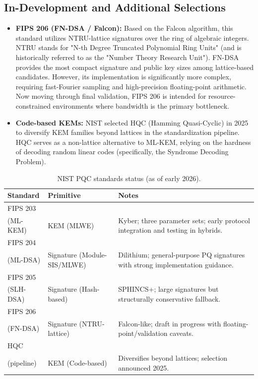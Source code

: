 \documentclass[11pt,a4paper]{article}
\begin{document}
\subsection{In-Development and Additional Selections}
\begin{itemize}[leftmargin=*]
  \item \textbf{FIPS 206 (FN-DSA / Falcon):} Based on the Falcon algorithm, this standard utilizes NTRU-lattice signatures over the ring of algebraic integers. NTRU stands for "N-th Degree Truncated Polynomial Ring Units" (and is historically referred to as the "Number Theory Research Unit"). FN-DSA provides the most compact signature and public key sizes among lattice-based candidates. However, its implementation is significantly more complex, requiring fast-Fourier sampling and high-precision floating-point arithmetic. Now moving through final validation, FIPS 206 is intended for resource-constrained environments where bandwidth is the primary bottleneck.\cite{fips206status}
  \item \textbf{Code-based KEMs:} NIST selected HQC (Hamming Quasi-Cyclic) in 2025 to diversify KEM families beyond lattices in the standardization pipeline. HQC serves as a non-lattice alternative to ML-KEM, relying on the hardness of decoding random linear codes (specifically, the Syndrome Decoding Problem).\cite{nistpqc}
\end{itemize}

\begin{table}[ht]
\centering
\begin{tabular}{@{}p{2.5cm}p{3.8cm}p{8.5cm}@{}}
\toprule
\textbf{Standard} & \textbf{Primitive} & \textbf{Notes} \\
\midrule
FIPS 203 \\(ML-KEM) & KEM (MLWE) & Kyber; three parameter sets; early protocol integration and testing in hybrids.\\
FIPS 204 \\(ML-DSA) & Signature \hspace{8mm}(Module-SIS/MLWE) & Dilithium; general-purpose PQ signatures with strong implementation guidance.\\
FIPS 205 \\(SLH-DSA) & Signature \hspace{12mm}(Hash-based) & SPHINCS+; large signatures but structurally conservative fallback.\\
FIPS 206 \\(FN-DSA) & Signature \hspace{8mm}(NTRU-lattice) & Falcon-like; draft in progress with floating-point/validation caveats.\\
HQC \\(pipeline) & KEM (Code-based) & Diversifies beyond lattices; selection announced 2025.\\
\bottomrule
\end{tabular}
\caption{NIST PQC standards status (as of early 2026).}
\end{table}
\end{document}
